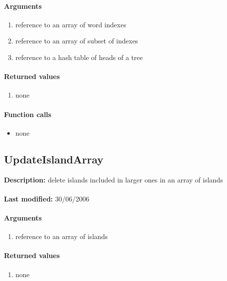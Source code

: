 \paragraph{Arguments}
\begin{enumerate}
\item reference to an array of word indexes
\item reference to an array of subset of indexes
\item reference to a hash table of heads of a tree
\end{enumerate}

\paragraph{Returned values}
\begin{enumerate}
\item none
\end{enumerate}

\paragraph{Function calls}
\begin{itemize}
\item none
\end{itemize}

\subsection{UpdateIslandArray}
\textbf{Description:} delete islands included in larger ones in an array of islands\\
\\\textbf{Last modified:} 30/06/2006

\paragraph{Arguments}
\begin{enumerate}
\item reference to an array of islands
\end{enumerate}

\paragraph{Returned values}
\begin{enumerate}
\item none
\end{enumerate}


